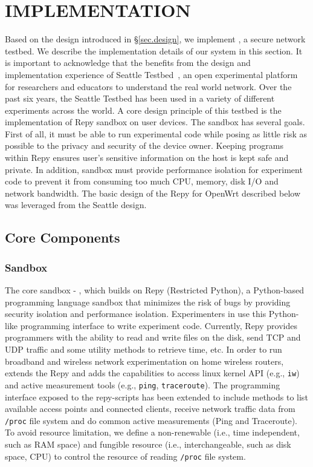 \chapter{IMPLEMENTATION} 
\label{sec.implementation}
Based on the design introduced in \S{\ref{sec.design}}, we implement \sysname, a 
secure network testbed. We describe the implementation details of our system 
in this section. It is important to acknowledge that the \sysname benefits from the design and implementation experience of Seattle Testbed~\cite{cappos2009seattle}, an open experimental platform for researchers and educators to understand the real world network. Over the past six years, the Seattle Testbed has been used in a variety of different experiments across the world. A core design principle of this testbed is the implementation of Repy sandbox on user devices. The sandbox has several goals. First of all, it must be able to run experimental code while posing as little risk as possible to the privacy and security of the device owner. Keeping programs within Repy ensures user's sensitive information on the host is kept safe and private. In addition, sandbox must provide performance isolation for experiment code to prevent it from consuming too much CPU, memory, disk I/O and network bandwidth. The basic design of the Repy for OpenWrt described below was leveraged from the Seattle design.

\section{Core Components}
\subsection{Sandbox}
\label{sec.sandbox}
The core sandbox - \sandboxname, which builds on Repy (Restricted Python), a Python-based programming language sandbox that minimizes the risk of bugs by providing security isolation and performance isolation. Experimenters in \sysname use this Python-like programming interface to write experiment code. Currently, Repy provides programmers with the ability to read and write files on the disk, send TCP and UDP traffic and some utility methods to retrieve time, etc. In order to run broadband and wireless network experimentation on home wireless routers, \sysname extends the Repy and adds the capabilities to access linux kernel API (e.g., \texttt{iw}) and active measurement tools (e.g., \texttt{ping}, \texttt{traceroute}). The programming interface exposed to the repy-scripts has been extended to include methods to list available access points and connected clients, receive network traffic data from \texttt{/proc} file system and do common active measurements (Ping and Traceroute). To avoid resource limitation, we define a non-renewable (i.e., time independent, such as RAM space) and fungible resource (i.e., interchangeable, such as disk space, CPU) \cite{li2015fence} to control the resource of reading \texttt{/proc} file system. 

